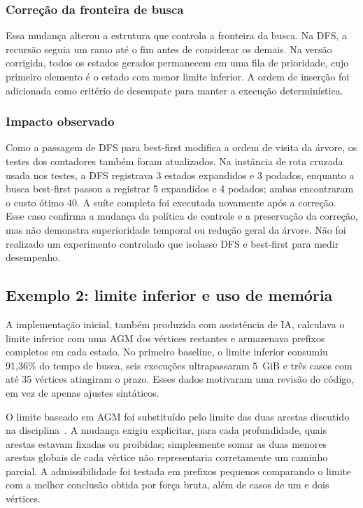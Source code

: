 \documentclass[12pt]{article}
\begin{document}
\subsubsection{Correção da fronteira de busca}

Essa mudança alterou a estrutura que controla a fronteira da busca. Na DFS, a
recursão seguia um ramo até o fim antes de considerar os demais. Na versão
corrigida, todos os estados gerados permanecem em uma fila de prioridade, cujo
primeiro elemento é o estado com menor limite inferior. A ordem de inserção foi
adicionada como critério de desempate para manter a execução determinística.

\subsubsection{Impacto observado}

Como a passagem de DFS para best-first modifica a ordem de visita da árvore,
os testes dos contadores também foram atualizados. Na instância de rota cruzada
usada nos testes, a DFS registrava 3 estados expandidos e 3 podados, enquanto a
busca best-first passou a registrar 5 expandidos e 4 podados; ambas encontraram
o custo ótimo 40. A suíte completa foi executada novamente após a correção.
Esse caso confirma a mudança da política de controle e a preservação da
correção, mas não demonstra superioridade temporal ou redução geral da árvore.
Não foi realizado um experimento controlado que isolasse DFS e best-first para
medir desempenho.

\subsection{Exemplo 2: limite inferior e uso de memória}

A implementação inicial, também produzida com assistência de IA, calculava o limite
inferior com uma AGM dos vértices restantes e armazenava prefixos completos em
cada estado. No primeiro baseline, o limite inferior consumiu 91,36\% do tempo
de busca, seis execuções ultrapassaram 5~GiB e três casos com até 35 vértices
atingiram o prazo. Esses dados motivaram uma revisão do código, em vez de apenas
ajustes sintáticos.

O limite baseado em AGM foi substituído pelo limite das duas arestas discutido
na disciplina~\cite{vimieiro2026aula12}. A mudança exigiu explicitar, para cada
profundidade, quais arestas estavam fixadas ou proibidas; simplesmente somar as
duas menores arestas globais de cada vértice não representaria corretamente um
caminho parcial. A admissibilidade foi testada em prefixos pequenos comparando o
limite com a melhor conclusão obtida por força bruta, além de casos de um e dois
vértices.
\end{document}
